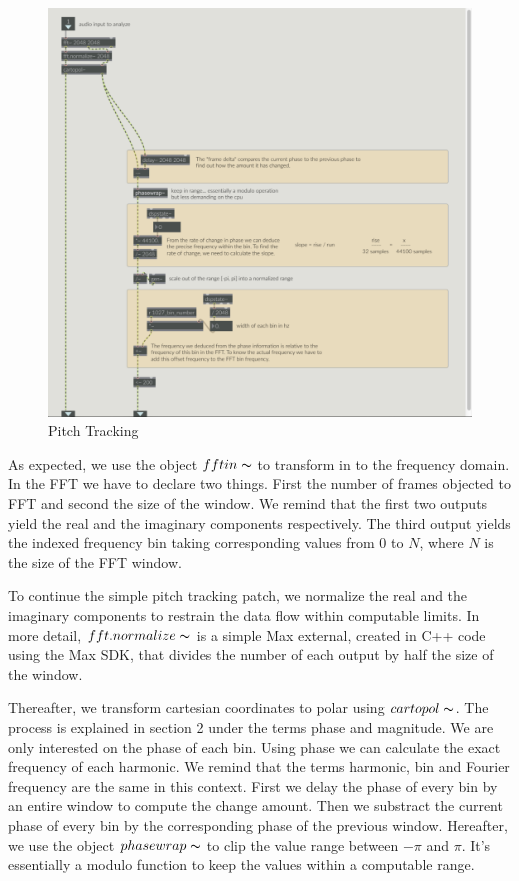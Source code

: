     
    \begin{figure}
        \centering
        \includegraphics[width = \textwidth ]{Graphs/fftTrack.png}
        \caption{Pitch Tracking}
        \label{PitchTracking}
    \end{figure}
As expected, we use the object $fftin\thicksim$ to transform in to the frequency domain. In the FFT we have to declare two things. First the number of frames objected to FFT and second the size of the window. We remind that the first two outputs yield the real and the imaginary components respectively. The third output yields the indexed frequency bin taking corresponding values from $0$ to $N$, where $N$ is the size of the FFT window.

To continue the simple pitch tracking patch, we normalize the real and the imaginary components to restrain the data flow within computable limits. In more detail, $fft.normalize\thicksim$ is a simple Max external, created in C++ code using the Max SDK, that divides the number of each output by half the size of the window. 

Thereafter, we transform cartesian coordinates to polar using $cartopol\thicksim$. The process is explained in section 2 under the terms phase and magnitude. We are only interested on the phase of each bin. Using phase we can calculate the exact frequency of each harmonic. We remind that the terms harmonic, bin and Fourier frequency are the same in this context.
First we delay the phase of every bin by an entire window to compute the change amount. Then we substract the current phase of every bin by the corresponding phase of the previous window. Hereafter, we use the object $phasewrap\thicksim$ to clip the value range between $-\pi$ and $\pi$. It's essentially a modulo function to keep the values within a computable range. 

